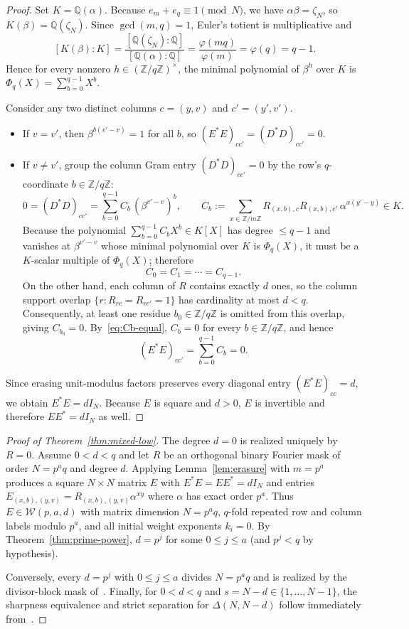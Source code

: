 \documentclass[11pt,reqno]{amsart}
\numberwithin{equation}{section}
\theoremstyle{definition}
\theoremstyle{remark}
\newcommand{\Q}{\mathbb{Q}}
\newcommand{\Z}{\mathbb{Z}}
\begin{document}
\begin{proof}
Set $K=\Q(\alpha)$. Because $e_m+e_q\equiv 1\pmod N$, we have $\alpha\beta=\zeta_N$, so $K(\beta)=\Q(\zeta_N)$. Since $\gcd(m,q)=1$, Euler's totient is multiplicative and
\[
[K(\beta):K] = \frac{[\Q(\zeta_N):\Q]}{[\Q(\alpha):\Q]} = \frac{\varphi(mq)}{\varphi(m)} = \varphi(q) = q-1.
\]
Hence for every nonzero $h\in(\Z/q\Z)^\times$, the minimal polynomial of $\beta^h$ over $K$ is $\Phi_q(X)=\sum_{b=0}^{q-1} X^b$.

Consider any two distinct columns $c=(y,v)$ and $c'=(y',v')$.
\begin{itemize}[leftmargin=1.5em]
\item If $v=v'$, then $\beta^{b(v'-v)}=1$ for all $b$, so $(E^*E)_{cc'}=(D^*D)_{cc'}=0$.
\item If $v\neq v'$, group the column Gram entry $(D^*D)_{cc'}=0$ by the row's $q$-coordinate $b\in\Z/q\Z$:
\[
0 = (D^*D)_{cc'} = \sum_{b=0}^{q-1} C_b\,(\beta^{v'-v})^b,
\qquad C_b := \sum_{x\in\Z/m\Z} R_{(x,b),c} R_{(x,b),c'}\,\alpha^{x(y'-y)} \in K.
\]
Because the polynomial $\sum_{b=0}^{q-1} C_b X^b\in K[X]$ has degree $\le q-1$ and vanishes at $\beta^{v'-v}$ whose minimal polynomial over $K$ is $\Phi_q(X)$, it must be a $K$-scalar multiple of $\Phi_q(X)$; therefore
\begin{equation}
\label{eq:Cb-equal}
C_0 = C_1 = \cdots = C_{q-1}.
\end{equation}
On the other hand, each column of $R$ contains exactly $d$ ones, so the column support overlap $\{r : R_{rc}=R_{rc'}=1\}$ has cardinality at most $d<q$. Consequently, at least one residue $b_0\in\Z/q\Z$ is omitted from this overlap, giving $C_{b_0}=0$. By~\eqref{eq:Cb-equal}, $C_b=0$ for every $b\in\Z/q\Z$, and hence
\[
(E^*E)_{cc'} = \sum_{b=0}^{q-1} C_b = 0.
\]
\end{itemize}
Since erasing unit-modulus factors preserves every diagonal entry $(E^*E)_{cc}=d$, we obtain $E^*E=dI_N$. Because $E$ is square and $d>0$, $E$ is invertible and therefore $EE^*=dI_N$ as well.
\end{proof}

\begin{proof}[Proof of Theorem~\ref{thm:mixed-low}]
The degree $d=0$ is realized uniquely by $R=0$. Assume $0<d<q$ and let $R$ be an orthogonal binary Fourier mask of order $N=p^a q$ and degree $d$. Applying Lemma~\ref{lem:erasure} with $m=p^a$ produces a square $N\times N$ matrix $E$ with $E^*E=EE^*=dI_N$ and entries $E_{(x,b),(y,v)}=R_{(x,b),(y,v)}\alpha^{xy}$ where $\alpha$ has exact order $p^a$. Thus $E\in\mathcal{W}(p,a,d)$ with matrix dimension $N=p^a q$, $q$-fold repeated row and column labels modulo $p^a$, and all initial weight exponents $k_i=0$. By Theorem~\ref{thm:prime-power}, $d=p^j$ for some $0\le j\le a$ (and $p^j<q$ by hypothesis).

Conversely, every $d=p^j$ with $0\le j\le a$ divides $N=p^a q$ and is realized by the divisor-block mask of~\cite[Section~2.1]{KKKKK26}. Finally, for $0<d<q$ and $s=N-d\in\{1,\ldots,N-1\}$, the sharpness equivalence and strict separation for $\Delta(N,N-d)$ follow immediately from~\cite[Theorem~1.1]{KKKKK26}.
\end{proof}
\end{document}
